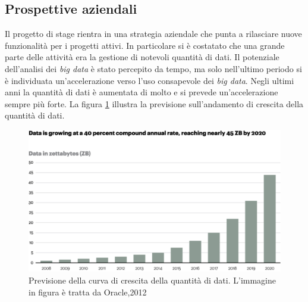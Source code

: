 \subsection{Prospettive aziendali}
Il progetto di stage rientra in una strategia aziendale che punta a rilasciare nuove funzionalità per i progetti attivi. In particolare si è costatato che una grande parte delle attività era la gestione di notevoli quantità di dati. Il potenziale dell'analisi dei \textit{big data} è stato percepito da tempo, ma solo nell'ultimo periodo si è individuata un'accelerazione verso l'uso consapevole dei \textit{big data}. Negli ultimi anni la quantità di dati è aumentata di molto e si prevede un'accelerazione sempre più forte.
La figura \ref{fig:bigdataStatistic} illustra la previsione sull'andamento di crescita della quantità di dati.
\begin{figure}[h]
	\centering
	\includegraphics[width=0.9\linewidth]{"immagini/bigdata"}
	\caption[Previsione della curva di crescita della quantità di dati]{Previsione della curva di crescita della quantità di dati. L'immagine in figura è tratta da Oracle,2012}
	\label{fig:bigdataStatistic}
\end{figure}

